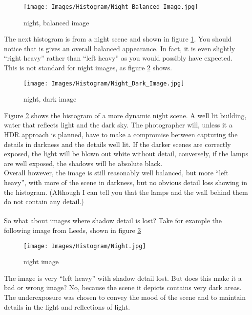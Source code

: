\begin{figure}
	\centering
		\texttt{[image: Images/Histogram/Night\_Balanced\_Image.jpg]}
	\caption{night, balanced image}
	\label{fig:Night_Balanced_Image}
\end{figure}

The next histogram is from a night scene and shown in figure \ref{fig:Night_Balanced_Image}. You should notice that is gives an overall balanced appearance. In fact, it is even slightly ``right heavy'' rather than ``left heavy'' as you would possibly have expected.
\\
This is not standard for night images, as figure \ref{fig:Night_Dark_Image} shows.

\begin{figure}
	\centering
		\texttt{[image: Images/Histogram/Night\_Dark\_Image.jpg]}
	\caption{night, dark image}
	\label{fig:Night_Dark_Image}
\end{figure}

Figure \ref{fig:Night_Dark_Image} shows the histogram of a more dynamic night scene. A well lit building, water that reflects light and the dark sky. The photographer will, unless it a \gls{HDR} approach is planned, have to make a compromise between capturing the details in darkness and the details well lit. If the darker scenes are correctly exposed, the light will be blown out white without detail, conversely, if the lamps are well exposed, the shadows will be absolute black.
\\
Overall however, the image is still reasonably well balanced, but more ``left heavy'', with more of the scene in darkness, but no obvious detail loss showing in the histogram. (Although I can tell you that the lamps and the wall behind them do not contain any detail.)
\\
\\
So what about images where shadow detail is lost? Take for example the following image from Leeds, shown in figure \ref{fig:Night}

\begin{figure}
	\centering
		\texttt{[image: Images/Histogram/Night.jpg]}
	\caption{night image}
	\label{fig:Night}
\end{figure}

The image is very ``left heavy'' with shadow detail lost. But does this make it a bad or wrong image? No, because the scene it depicts contains very dark areas. The underexposure was chosen to convey the mood of the scene and to maintain details in the light and reflections of light.

